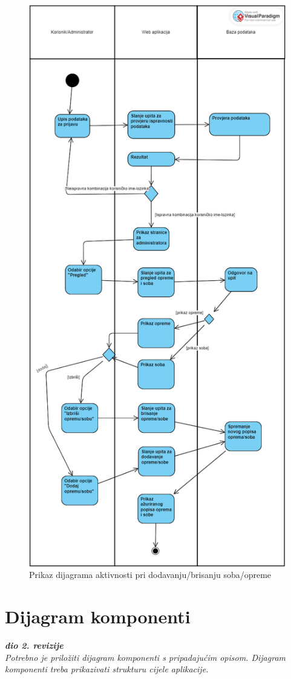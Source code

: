 			\begin{figure}[H]
				\includegraphics[scale=0.35]{slike/DijagramAktivnosti3.PNG} %
				\centering
				\caption{Prikaz dijagrama aktivnosti pri dodavanju/brisanju soba/opreme}
				\label{fig:promjene}
			\end{figure}
			
			\eject
		\section{Dijagram komponenti}
		
			\textbf{\textit{dio 2. revizije}}\\
		
			 \textit{Potrebno je priložiti dijagram komponenti s pripadajućim opisom. Dijagram komponenti treba prikazivati strukturu cijele aplikacije.}